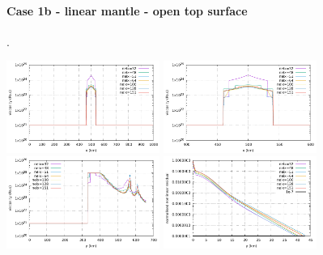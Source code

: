 \newpage
\paragraph{Case 1b - linear mantle - open top surface} . 


\begin{center}
\includegraphics[width=5cm]{python_codes/fieldstone_26/results/case1b/horizontal.pdf}
\includegraphics[width=5cm]{python_codes/fieldstone_26/results/case1b/horizontal_zoom.pdf}\\
\includegraphics[width=5cm]{python_codes/fieldstone_26/results/case1b/vertical.pdf}
\includegraphics[width=5cm]{python_codes/fieldstone_26/results/case1b/residual.pdf}
\end{center}

